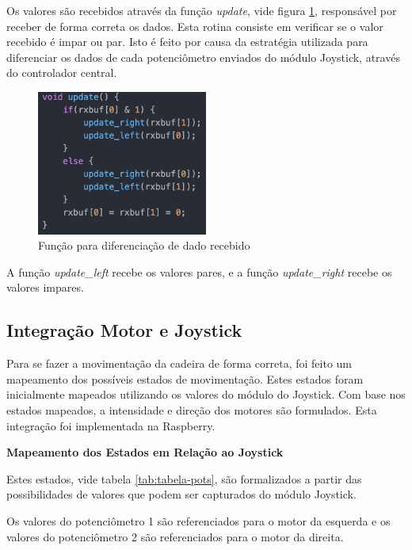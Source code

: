     Os valores são recebidos através da função \textit{update}, vide figura \ref{fig:update}, responsável por receber de forma correta os dados. Esta rotina consiste em verificar se o valor recebido é impar ou par. Isto é feito por causa da estratégia utilizada para diferenciar os dados de cada potenciômetro enviados do módulo Joystick, através do controlador central.

    \begin{figure}[!htb]
    \centering
    \includegraphics[width = 0.5\textwidth]{figuras/resultados/update}
    \caption{Função para diferenciação de dado recebido}
    \label{fig:update}
    \end{figure}


    A função \textit{update\_left} recebe os valores pares, e a função \textit{update\_right} recebe os valores impares.

\subsection{Integração Motor e Joystick}

Para se fazer a movimentação da cadeira de forma correta, foi feito um mapeamento dos possíveis estados de movimentação. Estes estados foram inicialmente mapeados utilizando os valores do módulo do Joystick. Com base nos estados mapeados, a intensidade e direção dos motores são formulados. Esta integração foi implementada na Raspberry.

  \textbf{Mapeamento dos Estados em Relação ao Joystick}

  Estes estados, vide tabela \ref{tab:tabela-pots}, são formalizados a partir das possibilidades de valores que podem ser capturados do módulo Joystick.

  Os valores do potenciômetro 1 são referenciados para o motor da esquerda e os valores do potenciômetro 2 são referenciados para o motor da direita.

